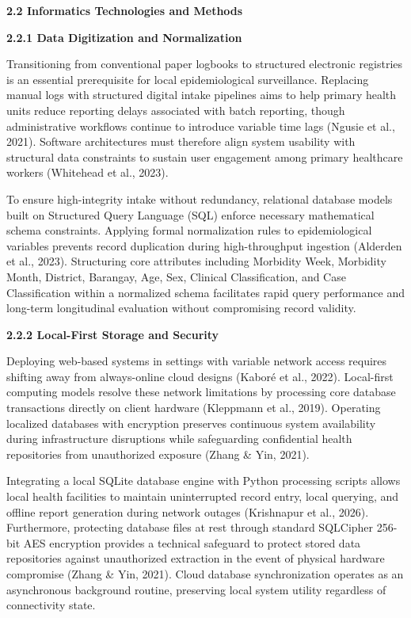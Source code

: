 \documentclass[
]{article}
\begin{document}
\textbf{2.2 Informatics Technologies and Methods}

\textbf{2.2.1 Data Digitization and Normalization}

Transitioning from conventional paper logbooks to structured electronic
registries is an essential prerequisite for local epidemiological
surveillance. Replacing manual logs with structured digital intake
pipelines aims to help primary health units reduce reporting delays
associated with batch reporting, though administrative workflows
continue to introduce variable time lags (Ngusie et al., 2021). Software
architectures must therefore align system usability with structural data
constraints to sustain user engagement among primary healthcare workers
(Whitehead et al., 2023).

To ensure high-integrity intake without redundancy, relational database
models built on Structured Query Language (SQL) enforce necessary
mathematical schema constraints. Applying formal normalization rules to
epidemiological variables prevents record duplication during
high-throughput ingestion (Alderden et al., 2023). Structuring core
attributes including Morbidity Week, Morbidity Month, District,
Barangay, Age, Sex, Clinical Classification, and Case Classification
within a normalized schema facilitates rapid query performance and
long-term longitudinal evaluation without compromising record validity.

\textbf{2.2.2 Local-First Storage and Security}

Deploying web-based systems in settings with variable network access
requires shifting away from always-online cloud designs (Kaboré et al.,
2022). Local-first computing models resolve these network limitations by
processing core database transactions directly on client hardware
(Kleppmann et al., 2019). Operating localized databases with encryption
preserves continuous system availability during infrastructure
disruptions while safeguarding confidential health repositories from
unauthorized exposure (Zhang \& Yin, 2021).

Integrating a local SQLite database engine with Python processing
scripts allows local health facilities to maintain uninterrupted record
entry, local querying, and offline report generation during network
outages (Krishnapur et al., 2026). Furthermore, protecting database
files at rest through standard SQLCipher 256-bit AES encryption provides
a technical safeguard to protect stored data repositories against
unauthorized extraction in the event of physical hardware compromise
(Zhang \& Yin, 2021). Cloud database synchronization operates as an
asynchronous background routine, preserving local system utility
regardless of connectivity state.
\end{document}
